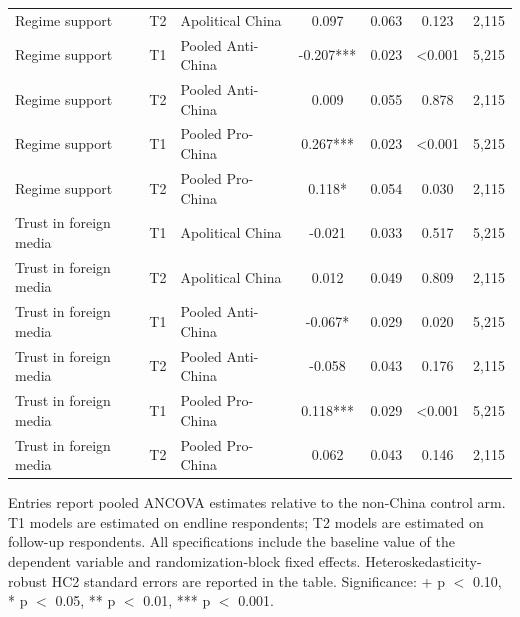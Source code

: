 \begin{table}[H]
\begin{threeparttable}
\begin{tabular}{lllcccc}
Regime support & T2 & Apolitical China & 0.097 & 0.063 & 0.123 & 2,115 \\
Regime support & T1 & Pooled Anti-China & -0.207*** & 0.023 & <0.001 & 5,215 \\
Regime support & T2 & Pooled Anti-China & 0.009 & 0.055 & 0.878 & 2,115 \\
Regime support & T1 & Pooled Pro-China & 0.267*** & 0.023 & <0.001 & 5,215 \\
Regime support & T2 & Pooled Pro-China & 0.118* & 0.054 & 0.030 & 2,115 \\
Trust in foreign media & T1 & Apolitical China & -0.021 & 0.033 & 0.517 & 5,215 \\
Trust in foreign media & T2 & Apolitical China & 0.012 & 0.049 & 0.809 & 2,115 \\
Trust in foreign media & T1 & Pooled Anti-China & -0.067* & 0.029 & 0.020 & 5,215 \\
Trust in foreign media & T2 & Pooled Anti-China & -0.058 & 0.043 & 0.176 & 2,115 \\
Trust in foreign media & T1 & Pooled Pro-China & 0.118*** & 0.029 & <0.001 & 5,215 \\
Trust in foreign media & T2 & Pooled Pro-China & 0.062 & 0.043 & 0.146 & 2,115 \\
\bottomrule
\end{tabular}
\begin{tablenotes}[flushleft]
\footnotesize
\item Entries report pooled ANCOVA estimates relative to the non-China control arm. T1 models are estimated on endline respondents; T2 models are estimated on follow-up respondents. All specifications include the baseline value of the dependent variable and randomization-block fixed effects. Heteroskedasticity-robust HC2 standard errors are reported in the table. Significance: + p $<$ 0.10, * p $<$ 0.05, ** p $<$ 0.01, *** p $<$ 0.001.
\end{tablenotes}
\end{threeparttable}
\end{table}
